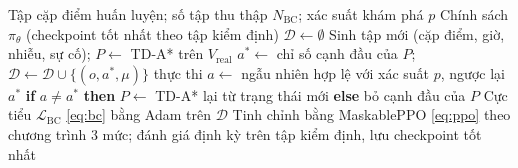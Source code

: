 \begin{algorithm}[H]
\caption{Huấn luyện RL cây-GNN + BC}\label{alg:bc}
\begin{algorithmic}[1]
\Require Tập cặp điểm huấn luyện; số tập thu thập $N_{\text{BC}}$; xác suất khám phá $p$
\Ensure Chính sách $\pi_\theta$ (checkpoint tốt nhất theo tập kiểm định)
\State $\mathcal{D}\gets\emptyset$
  \State Sinh tập mới (cặp điểm, giờ, nhiễu, sự cố); $P\gets$ TD-A* trên $V_{\text{real}}$ 
    \State $a^\ast\gets$ chỉ số cạnh đầu của $P$; $\mathcal{D}\gets\mathcal{D}\cup\{(o,a^\ast,\mu)\}$
    \State thực thi $a\gets$ ngẫu nhiên hợp lệ với xác suất $p$, ngược lại $a^\ast$
    \State \textbf{if} $a\neq a^\ast$ \textbf{then} $P\gets$ TD-A* lại từ trạng thái mới \textbf{else} bỏ cạnh đầu của $P$
  \EndWhile
\EndFor
\State Cực tiểu $\mathcal{L}_{\text{BC}}$ \eqref{eq:bc} bằng Adam trên $\mathcal{D}$
\State Tinh chỉnh bằng MaskablePPO \eqref{eq:ppo} theo chương trình 3 mức; đánh giá định kỳ trên tập kiểm định, lưu checkpoint tốt nhất
\end{algorithmic}
\end{algorithm}
